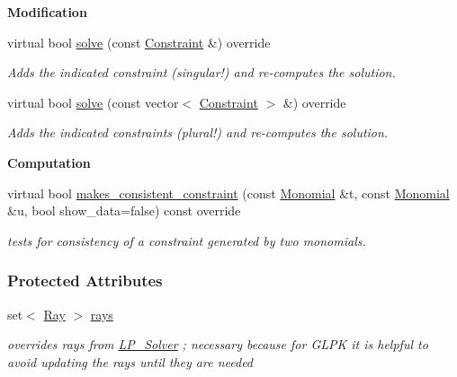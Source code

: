 \begin{Indent}\textbf{ Modification}\par
\begin{DoxyCompactItemize}
\item 
virtual bool \hyperlink{group___c_l_s_solvers_aadfa4655b194b3b095db962c5900fee6}{solve} (const \hyperlink{group___c_l_s_solvers_class_l_p___solvers_1_1_constraint}{Constraint} \&) override
\begin{DoxyCompactList}\small\item\em Adds the indicated constraint (singular!) and re-\/computes the solution. \end{DoxyCompactList}\item 
virtual bool \hyperlink{group___c_l_s_solvers_a08fcdf86d0fcd8ac3e5da077b627e477}{solve} (const vector$<$ \hyperlink{group___c_l_s_solvers_class_l_p___solvers_1_1_constraint}{Constraint} $>$ \&) override
\begin{DoxyCompactList}\small\item\em Adds the indicated constraints (plural!) and re-\/computes the solution. \end{DoxyCompactList}\end{DoxyCompactItemize}
\end{Indent}
\begin{Indent}\textbf{ Computation}\par
\begin{DoxyCompactItemize}
\item 
\mbox{\label{group___c_l_s_solvers_a23e950a4911f140ddffdcaeb062f7b80}} 
virtual bool \hyperlink{group___c_l_s_solvers_a23e950a4911f140ddffdcaeb062f7b80}{makes\+\_\+consistent\+\_\+constraint} (const \hyperlink{group__polygroup_class_monomial}{Monomial} \&t, const \hyperlink{group__polygroup_class_monomial}{Monomial} \&u, bool show\+\_\+data=false) const override
\begin{DoxyCompactList}\small\item\em tests for consistency of a constraint generated by two monomials. \end{DoxyCompactList}\end{DoxyCompactItemize}
\end{Indent}
\subsubsection*{Protected Attributes}
\begin{DoxyCompactItemize}
\item 
set$<$ \hyperlink{group___c_l_s_solvers_class_l_p___solvers_1_1_ray}{Ray} $>$ \hyperlink{group___c_l_s_solvers_ad748438e4625935b7c4ce4d677b2cdfd}{rays}
\begin{DoxyCompactList}\small\item\em overrides {\ttfamily rays} from {\ttfamily \hyperlink{group___c_l_s_solvers_class_l_p___solvers_1_1_l_p___solver}{L\+P\+\_\+\+Solver}} ; necessary because for G\+L\+PK it is helpful to avoid updating the rays until they are needed \end{DoxyCompactList}\end{DoxyCompactItemize}


